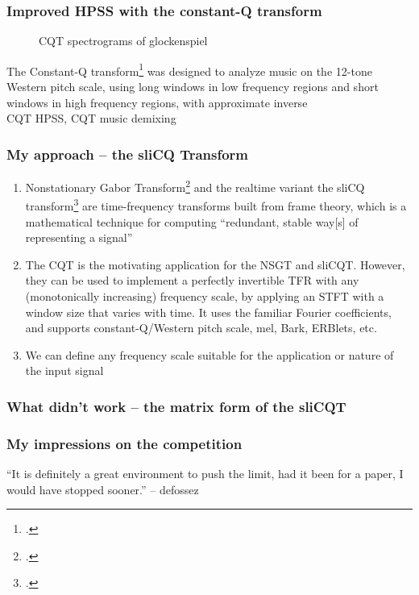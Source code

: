 \documentclass[usenames,dvipsnames]{beamer}
\begin{document}
\begin{frame}
	\frametitle{Improved HPSS with the constant-Q transform}
	\begin{figure}[ht]
		\vspace{-1em}
		\centering
		\hspace{1em}
		\caption{CQT spectrograms of glockenspiel}
		\vspace{-1em}
	\end{figure}
	The Constant-Q transform\footcite{jbrown} was designed to analyze music on the 12-tone Western pitch scale, using long windows in low frequency regions and short windows in high frequency regions, with approximate inverse\\
	CQT HPSS, CQT music demixing
\end{frame}

\begin{frame}
	\frametitle{My approach -- the sliCQ Transform}
	\begin{enumerate}
	\item
		Nonstationary Gabor Transform\footcite{balazs} and the realtime variant the sliCQ transform\footcite{invertiblecqt} are time-frequency transforms built from frame theory, which is a mathematical technique for computing ``redundant, stable way[s] of representing a signal''
	\item
		The CQT is the motivating application for the NSGT and sliCQT. However, they can be used to implement a perfectly invertible TFR with any (monotonically increasing) frequency scale, by applying an STFT with a window size that varies with time. It uses the familiar Fourier coefficients, and supports constant-Q/Western pitch scale, mel, Bark, ERBlets, etc.
	\item
		We can define any frequency scale suitable for the application or nature of the input signal
	\end{enumerate}
\end{frame}

\begin{frame}
	\frametitle{What didn't work -- the matrix form of the sliCQT}
\end{frame}

\begin{frame}
	\frametitle{My impressions on the competition}
 ``It is definitely a great environment to push the limit, had it been for a paper, I would have stopped sooner.'' -- defossez
\end{frame}
\end{document}
